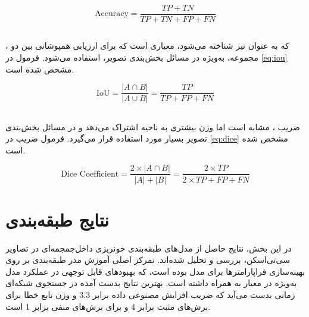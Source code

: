 \begin{latin}
\begin{equation}
\label{eq:accuracy}
\text{Accuracy} = \frac{TP + TN}{TP + TN + FP + FN}
\end{equation}
\end{latin}

\subsection{}

، که به عنوان  نیز شناخته می‌شود، معیاری است که برای ارزیابی همپوشانی بین دو مجموعه، به‌ویژه در مسائل بخش‌بندی تصویر، استفاده می‌شود. فرمول  در \autoref{eq:iou} مشخص شده است.

\begin{latin}
\begin{equation}
\label{eq:iou}
\text{IoU} = \frac{|A \cap B|}{|A \cup B|} = \frac{TP}{TP + FP + FN}
\end{equation}
\end{latin}

\subsection{}

ضریب ، مشابه  است اما وزن بیشتری به ناحیه اشتراک می‌دهد و در مسائل بخش‌بندی تصویر بسیار مورد استفاده قرار می‌گیرد. فرمول ضریب  در \autoref{eq:dice} مشخص شده است.

\begin{latin}
\begin{equation}
\label{eq:dice}
\text{Dice Coefficient} = \frac{2 \times |A \cap B|}{|A| + |B|} = \frac{2 \times TP}{2 \times TP + FP + FN}
\end{equation}
\end{latin}

\section{نتایج طبقه‌بندی}

در این بخش، نتایج حاصل از مدل‌های طبقه‌بندی خونریزی داخل‌جمجمه‌ای در تصاویر سی‌تی‌اسکن، بررسی و تحلیل شده‌اند. تمرکز اصلی آموزش مدر طبقه‌بندی بر روی بهینه‌سازی فراپارامترها برای مدل
  بوده است، که بهبودهای قابل توجهی در عملکرد مدل به‌ویژه در معیار 
   به همراه داشته است. بهترین نتایج بدست آمده در جستجوی شبکه‌ای زمانی بدست می‌آید که ضریب افزایش مصنوعی داده برابر 
   $3.3$
و وزن تابع خطا
برای برش‌های مثبت برابر 4 و برای برش‌های منفی برابر 1 است.

